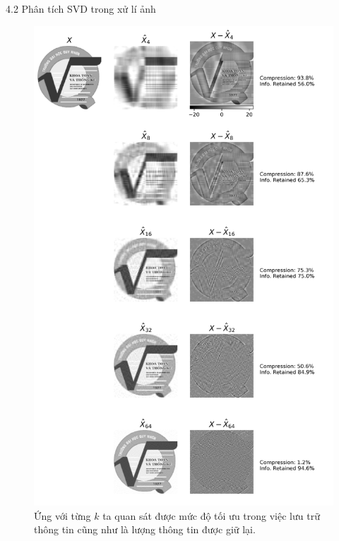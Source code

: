 \documentclass[notheorems,envcountsect,hyperref=unicode]{beamer}
\begin{document}
\begin{frame}{4.2 Phân tích SVD trong xử lí ảnh}
\begin{figure}[htp]
	\centering
	\includegraphics[scale=0.2]{svd_qnu.png}
	\caption{Ứng với từng $k$ ta quan sát được mức độ tối ưu trong việc lưu trữ thông tin cũng như là lượng thông tin được giữ lại.}
	\label{fig:svd_qnu}
\end{figure}
\end{frame}
\end{document}
